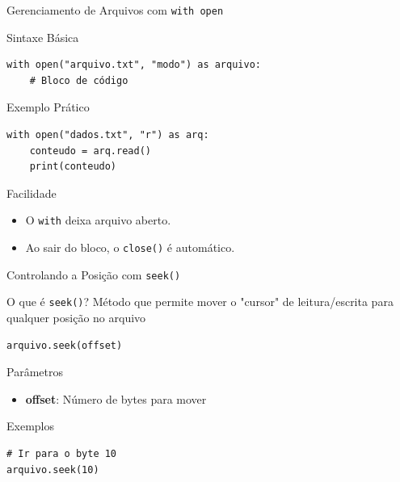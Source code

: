 \begin{frame}[fragile]{Gerenciamento de Arquivos com \texttt{with open}}
    \begin{block}{Sintaxe Básica}
        \begin{verbatim}
with open("arquivo.txt", "modo") as arquivo:
    # Bloco de código
        \end{verbatim}
    \end{block}

    \begin{exampleblock}{Exemplo Prático}
        \begin{verbatim}
with open("dados.txt", "r") as arq:
    conteudo = arq.read()
    print(conteudo)
                \end{verbatim}
    \end{exampleblock}


    \begin{block}{Facilidade}
        \begin{itemize}
            \item O \texttt{with} deixa arquivo aberto.
            \item Ao sair do bloco, o \texttt{close()} é  automático.
        \end{itemize}

    \end{block}
\end{frame}

\begin{frame}[fragile]{Controlando a Posição com \texttt{seek()}}

    \begin{block}{O que é \texttt{seek()}?}
        Método que permite mover o "cursor" de leitura/escrita para qualquer posição no arquivo
        \begin{verbatim}
arquivo.seek(offset)
        \end{verbatim}
    \end{block}


    \begin{alertblock}{Parâmetros}
        \begin{itemize}
            \item \textbf{offset}: Número de bytes para mover

        \end{itemize}
    \end{alertblock}

    \begin{exampleblock}{Exemplos}
        \begin{verbatim}
# Ir para o byte 10
arquivo.seek(10)
                \end{verbatim}
    \end{exampleblock}





\end{frame}

